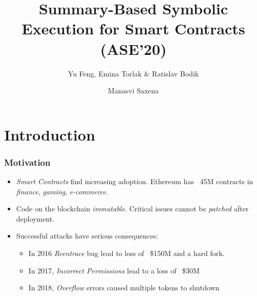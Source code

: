 \documentclass{beamer}
\title[]{Summary-Based Symbolic Execution for Smart Contracts (ASE'20)}
\subtitle{Yu Feng, Emina Torlak \& Ratislav Bodik}
\author{Manasvi Saxena}
\date{}
\begin{document}
\frame{\titlepage}

\section{Introduction}

\begin{frame}
  \frametitle{Motivation}
  \begin{itemize}
    \item \textit{Smart Contracts} find increasing adoption.
      Ethereum has ~45M contracts in
      \textit{finance}, \textit{gaming}, \textit{e-commerce}.
    \item Code on the blockchain \textit{immutable}. Critical
      issues cannot be \textit{patched} after deployment.
    \item Successful attacks have serious consequences:
      \begin{itemize}
        \item In 2016 \textit{Reentrace} bug lead to loss of ~\$150M and a hard
          fork.
        \item In 2017, \textit{Incorrect Permissions} lead to a loss of ~\$30M
        \item In 2018, \textit{Overflow} errors caused multiple tokens to shutdown
      \end{itemize}
  \end{itemize}
\end{frame}
\end{document}
